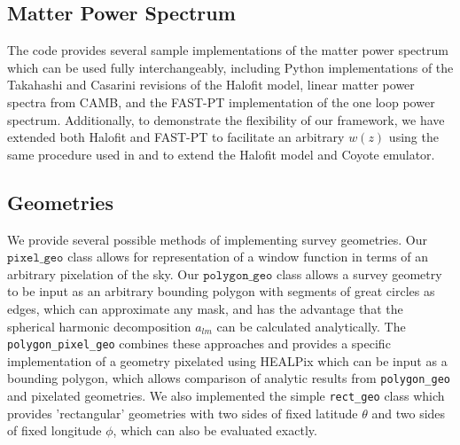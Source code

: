 \documentclass[a4paper,11pt]{article}
\begin{document}
\subsection{Matter Power Spectrum}
\label{ssec:matter_power}
The code provides several sample implementations of the matter power spectrum which can be used fully interchangeably, including Python implementations of the Takahashi\cite{takahashi_halofit} and Casarini\cite{casarini_halofit} revisions of the Halofit\cite{smith_halofit} model, linear matter power spectra from CAMB\cite{camb}, and the FAST-PT\cite{fastpt} implementation of the one loop power spectrum. Additionally, to demonstrate the flexibility of our framework, we have extended both Halofit and FAST-PT to facilitate an arbitrary $w(z)$ using the same procedure used in \cite{casarini_halofit} and \cite{casarini_halofit_math} to extend the Halofit model and Coyote emulator\cite{coyote_emulator}. 

\subsection{Geometries}
\label{ssec:geometries}
We provide several possible methods of implementing survey geometries. Our $\texttt{pixel\_geo}$ class allows for representation of a window function in terms of an arbitrary pixelation of the sky. Our $\texttt{polygon\_geo}$ class allows a survey geometry to be input as an arbitrary bounding polygon with segments of great circles as edges, which can approximate any mask, and has the advantage that the spherical harmonic decomposition $a_{l m}$ can be calculated analytically. The \texttt{polygon\_pixel\_geo} combines these approaches and provides a specific implementation of a geometry pixelated using HEALPix\cite{HEALPix} which can be input as a bounding polygon, which allows comparison of analytic results from \texttt{polygon\_geo} and pixelated geometries. We also implemented the simple \texttt{rect\_geo} class which provides 'rectangular' geometries with two sides of fixed latitude $\theta$ and two sides of fixed longitude $\phi$, which can also be evaluated exactly. 
\end{document}
